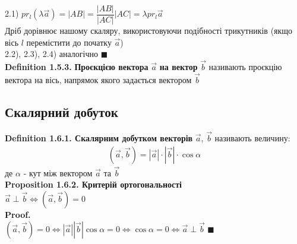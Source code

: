\documentclass[a4paper, 14pt]{extarticle}
\def\defin#1{\textbf{Definition {#1}}}
\def\prp#1{\textbf{Proposition {#1}}}
\def\proof{\textbf{Proof.}\\}
\def\bigline{\vspace{5mm}\\}
\def\qed{$\blacksquare$}
\begin{document}
	2.1) $pr_l (\lambda \vec{a}) = |AB| = \dfrac{|AB|}{|AC|} |AC| = \lambda pr_l \vec{a}$\\
	Дріб дорівнює нашому скаляру, використовуючи подібності трикутників (якщо вісь $l$ перемістити до початку $\vec{a}$)\\
	2.2), 2.3), 2.4) аналогічно \qed
	\bigline
	\defin{1.5.3.} \textbf{Проєкцією вектора} $\vec{a}$ \textbf{на вектор} $\vec{b}$ називають проєкцію вектора на вісь, напрямок якого задається вектором $\vec{b}$\\
	
	\subsection{Скалярний добуток}
	\defin{1.6.1. Скалярним добутком векторів} $\vec{a}$, $\vec{b}$ називають величину:
	\begin{align*}
	(\vec{a}, \vec{b}) = |\vec{a}| \cdot |\vec{b}| \cdot \cos \alpha
	\end{align*}
	де $\alpha$ - кут між вектором $\vec{a}$ та $\vec{b}$
	\bigline
	\prp{1.6.2. Критерій ортогональності}\\
	$\vec{a} \perp \vec{b} \iff (\vec{a}, \vec{b}) = 0$\\
	\proof
	$(\vec{a}, \vec{b}) = 0 \iff |\vec{a}| |\vec{b}| \cos \alpha = 0 \iff \cos \alpha = 0 \iff \vec{a} \perp \vec{b}$ \qed
	\bigline
	
\end{document}
